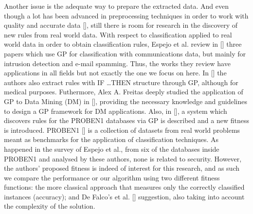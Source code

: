 Another issue is the adequate way to prepare the extracted data. And even though a lot has been advanced in preprocessing techniques in order to work with quality and accurate data [\cite{han2011data}], still there is room for research in the discovery of new rules from real world data. With respect to classification applied to real world data in order to obtain classification rules, Espejo et al. review in [\cite{espejo2010survey}] three papers which use GP for classification with
communications data, but mainly for intrusion detection and e-mail
spamming. Thus, the works they review have applications in
all fields but not exactly the one we focus on here. In [\cite{Tsakonas2004195}] the authors also extract rules with \textsc{IF \ldots THEN} structure through GP, although for medical purposes. Futhermore, Alex A. Freitas deeply studied the application of GP to Data Mining (DM) in [\cite{freitas2002data}], providing the necessary knowledge and guidelines to design a GP framework for DM applications. Also, in [\cite{DeFalco2002257}], a system which discovers
rules for the PROBEN1 databases via GP is described and a new fitness is introduced. PROBEN1 [\cite{prechelt1994proben}] is a collection of datasets from real world problems meant as benchmarks for the application of classification techniques. As happened in 
the survey of Espejo et al., from six of the databases inside PROBEN1 and
analysed by these authors, none is related to security. However, the
authors' proposed fitness is indeed of interest for this research, and
as such we compare the performance or our algorithm using two
different fitness functions: the more classical approach that measures
only the correctly classified instances (accuracy); and De Falco's et
al. [\cite{DeFalco2002257}] suggestion, also taking into account the
complexity of the solution.

